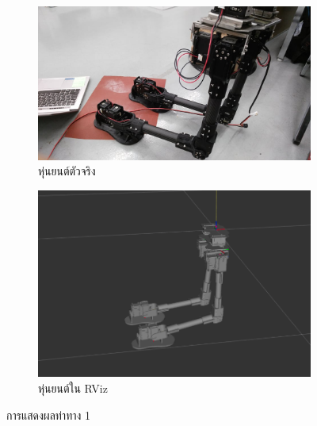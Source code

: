 \begin{figure}[!ht]
    \centering
    \begin{subfigure}[b]{0.45\textwidth}
        \centering
        \includegraphics[width=\textwidth]{chapter4/images/robot_2_rviz1.jpg}
        \caption{หุ่นยนต์ตัวจริง}
    \end{subfigure}
    \hfill
    \begin{subfigure}[b]{0.45\textwidth}
        \centering
        \includegraphics[width=\textwidth]{chapter4/images/robot_2_rviz1.png}
        \caption{หุ่นยนต์ใน RViz}
    \end{subfigure}
    \caption{การแสดงผลท่าทาง 1}
	\label{fig:robot_2_rviz1}
\end{figure}

